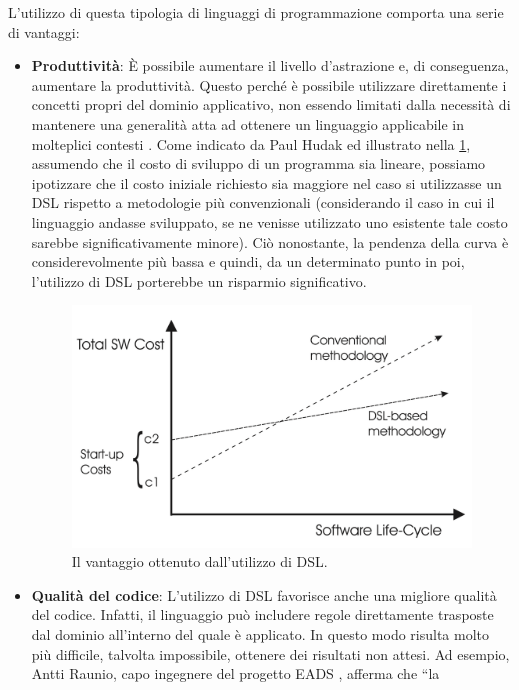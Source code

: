 \documentclass[12pt,a4paper,openright,twoside]{book}
\begin{document}
L’utilizzo di questa tipologia di linguaggi di programmazione comporta una serie di vantaggi:
\begin{itemize}
    \item \textbf{Produttività}: È possibile aumentare il livello d’astrazione e, di conseguenza, aumentare la produttività. Questo perché è 
    possibile utilizzare direttamente i concetti propri del dominio applicativo, non essendo limitati dalla necessità di mantenere una 
    generalità atta ad ottenere un linguaggio applicabile in molteplici contesti  \cite{Kelly2008}. Come indicato da Paul Hudak 
    \cite{Hudak1997} ed illustrato nella \cref{fig:sw-dev-cost}, assumendo che il costo di sviluppo di un programma sia lineare, possiamo 
    ipotizzare che il costo iniziale richiesto sia maggiore nel caso si utilizzasse un \ac{DSL} rispetto a metodologie più convenzionali 
    (considerando il caso in cui il linguaggio andasse sviluppato, se ne venisse utilizzato uno esistente tale costo sarebbe significativamente 
    minore). Ciò nonostante, la pendenza della curva è considerevolmente più bassa e quindi, da un determinato punto in poi, l’utilizzo di 
    \ac{DSL} porterebbe un risparmio significativo.
    \begin{figure}
        \centering
        \includegraphics[width=.8\linewidth]{figures/sw-dev-cost.pdf}
        \caption{Il vantaggio ottenuto dall'utilizzo di DSL.}
        \label{fig:sw-dev-cost}
    \end{figure}
    \item \textbf{Qualità del codice}: L'utilizzo di \ac{DSL} favorisce anche una migliore qualità del codice. Infatti, il linguaggio può 
    includere regole direttamente trasposte dal dominio all'interno del quale è applicato. In questo modo risulta molto più difficile, talvolta 
    impossibile, ottenere dei risultati non attesi. Ad esempio, Antti Raunio, capo ingegnere del progetto EADS \cite{EADS}, afferma che ``la 

\end{itemize}
\end{document}
